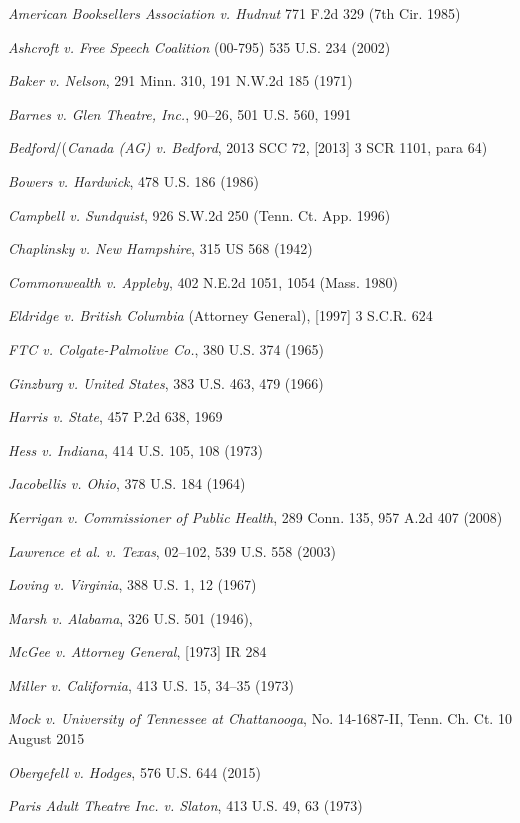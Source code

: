 \documentclass[paper=a4,book,openany]{jlreq} \usepackage{mystyle}
\begin{document}
\begin{mylist}

\item \emph{American Booksellers Association v. Hudnut} 771 F.2d 329 (7th Cir. 1985)
\item \emph{Ashcroft v. Free Speech Coalition} (00-795) 535 U.S. 234 (2002)
\item \emph{Baker v. Nelson}, 291 Minn. 310, 191 N.W.2d 185 (1971)
\item \emph{Barnes v. Glen Theatre, Inc.}, 90--26, 501 U.S. 560, 1991
\item \emph{Bedford}/(\emph{Canada (AG) v. Bedford}, 2013 SCC 72, [2013] 3 SCR 1101, para 64)
\item \emph{Bowers v. Hardwick}, 478 U.S. 186 (1986)
\item \emph{Campbell v. Sundquist}, 926 S.W.2d 250 (Tenn. Ct. App. 1996)
\item \emph{Chaplinsky v. New Hampshire}, 315 US 568 (1942)
\item \emph{Commonwealth v. Appleby}, 402 N.E.2d 1051, 1054 (Mass. 1980)
\item \emph{Eldridge v. British Columbia} (Attorney General), [1997] 3 S.C.R. 624
\item \emph{FTC v. Colgate-Palmolive Co.}, 380 U.S. 374 (1965)
\item \emph{Ginzburg v. United States}, 383 U.S. 463, 479 (1966)
\item \emph{Harris v. State}, 457 P.2d 638, 1969
\item \emph{Hess v. Indiana}, 414 U.S. 105, 108 (1973)
\item \emph{Jacobellis v. Ohio}, 378 U.S. 184 (1964) 
\item \emph{Kerrigan v. Commissioner of Public Health}, 289 Conn. 135, 957 A.2d 407 (2008)
\item \emph{Lawrence et al. v. Texas}, 02--102, 539 U.S. 558 (2003)
\item \emph{Loving v. Virginia}, 388 U.S. 1, 12 (1967)
\item \emph{Marsh v. Alabama}, 326 U.S. 501 (1946),
\item \emph{McGee v. Attorney General}, [1973] IR 284
\item \emph{Miller v. California}, 413 U.S. 15, 34--35 (1973)
\item \emph{Mock v. University of Tennessee at Chattanooga}, No. 14-1687-II, Tenn. Ch. Ct. 10 August 2015
\item \emph{Obergefell v. Hodges}, 576 U.S. 644 (2015)
\item \emph{Paris Adult Theatre Inc. v. Slaton}, 413 U.S. 49, 63 (1973)

\end{mylist}
\end{document}
